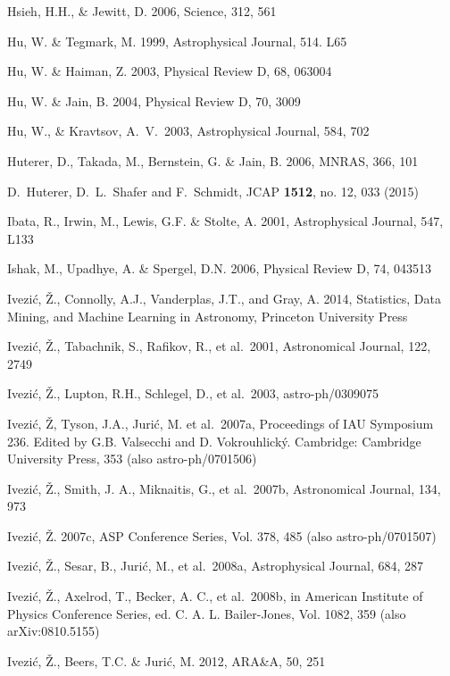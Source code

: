\documentclass[twocolumn]{aastex61}
\begin{document}
\begin{thebibliography}{}
\bibitem[()]{} Hsieh, H.H., \& Jewitt, D. 2006, Science, 312, 561

\bibitem[()]{} Hu, W. \& Tegmark, M. 1999, Astrophysical Journal, 514. L65

\bibitem[()]{} Hu, W. \& Haiman, Z. 2003, Physical Review D, 68, 063004

\bibitem[()]{} Hu, W. \& Jain, B. 2004, Physical Review D, 70, 3009

\bibitem[()]{} Hu, W., \& Kravtsov, A.~V.\ 2003, Astrophysical Journal, 584, 702

\bibitem[()]{} Huterer, D., Takada, M., Bernstein, G. \& Jain, B. 2006, MNRAS, 366, 101

\bibitem[()]{}  D.~Huterer, D.~L.~Shafer and F.~Schmidt, JCAP {\bf 1512}, no. 12, 033 (2015)

\bibitem[()]{} Ibata, R., Irwin, M., Lewis, G.F. \& Stolte, A. 2001, Astrophysical Journal, 547, L133

\bibitem[()]{} Ishak, M., Upadhye, A. \& Spergel, D.N. 2006, Physical Review D, 74, 043513

\bibitem[()]{} Ivezi\'c, \v Z., Connolly, A.J., Vanderplas, J.T., and
  Gray, A. 2014, Statistics, Data Mining, and Machine Learning in
  Astronomy, Princeton University Press

\bibitem[()]{} Ivezi\'{c}, \v{Z}., Tabachnik, S., Rafikov, R., et al.~2001, Astronomical Journal, 122, 2749

\bibitem[()]{} Ivezi\'c, \v Z., Lupton, R.H., Schlegel, D., et al.~2003, astro-ph/0309075

\bibitem[()]{} Ivezi\'{c}, \v{Z}, Tyson, J.A., Juri\'{c}, M. et al.~2007a, Proceedings of IAU Symposium
             236. Edited by G.B. Valsecchi and D. Vokrouhlick\'{y}. Cambridge: Cambridge University
             Press, 353 (also astro-ph/0701506)

\bibitem[()]{} Ivezi\'{c}, \v{Z}., Smith, J. A., Miknaitis, G., et al.~2007b, Astronomical Journal, 134, 973

\bibitem[()]{} Ivezi\'{c}, \v{Z}. 2007c, ASP Conference Series, Vol. 378, 485 (also astro-ph/0701507)

\bibitem[()]{} Ivezi\'c, \v Z., Sesar, B., Juri\'{c}, M., et al.~2008a, Astrophysical Journal, 684, 287

\bibitem[()]{} Ivezi\'c, \v Z., Axelrod, T., Becker, A. C., et al.~2008b, in American Institute of
                           Physics Conference Series, ed. C. A. L. Bailer-Jones, Vol. 1082, 359 (also arXiv:0810.5155)

\bibitem[()]{} Ivezi\'c, \v Z., Beers, T.C. \& Juri\'{c}, M. 2012, ARA\&A, 50, 251


\end{thebibliography}
\end{document}
